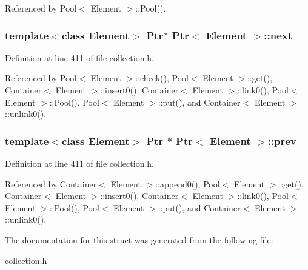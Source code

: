 Referenced by Pool$<$ Element $>$::Pool().\hypertarget{structPtr_c35273d22c86522bff2de62e103f6114}{
\subsubsection[{next}]{\setlength{\rightskip}{0pt plus 5cm}template$<$class Element$>$ {\bf Ptr}$\ast$ {\bf Ptr}$<$ Element $>$::{\bf next}}}
\label{structPtr_c35273d22c86522bff2de62e103f6114}




Definition at line 411 of file collection.h.

Referenced by Pool$<$ Element $>$::check(), Pool$<$ Element $>$::get(), Container$<$ Element $>$::insert0(), Container$<$ Element $>$::link0(), Pool$<$ Element $>$::Pool(), Pool$<$ Element $>$::put(), and Container$<$ Element $>$::unlink0().\hypertarget{structPtr_e2ac6d1ef67208a954ad1d3d7d9785bf}{
\subsubsection[{prev}]{\setlength{\rightskip}{0pt plus 5cm}template$<$class Element$>$ {\bf Ptr} $\ast$ {\bf Ptr}$<$ Element $>$::{\bf prev}}}
\label{structPtr_e2ac6d1ef67208a954ad1d3d7d9785bf}




Definition at line 411 of file collection.h.

Referenced by Container$<$ Element $>$::append0(), Pool$<$ Element $>$::get(), Container$<$ Element $>$::insert0(), Container$<$ Element $>$::link0(), Pool$<$ Element $>$::Pool(), Pool$<$ Element $>$::put(), and Container$<$ Element $>$::unlink0().

The documentation for this struct was generated from the following file:\begin{CompactItemize}
\item 
\hyperlink{collection_8h}{collection.h}\end{CompactItemize}
